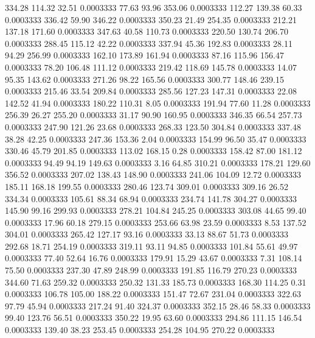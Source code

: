  334.28  114.32   32.51   0.0003333
  77.63   93.96  353.06   0.0003333
 112.27  139.38   60.33   0.0003333
 336.42   59.90  346.22   0.0003333
 350.23   21.49  254.35   0.0003333
 212.21  137.18  171.60   0.0003333
 347.63   40.58  110.73   0.0003333
 220.50  130.74  206.70   0.0003333
 288.45  115.12   42.22   0.0003333
 337.94   45.36  192.83   0.0003333
  28.11   94.29  256.99   0.0003333
 162.10  173.89  161.94   0.0003333
  87.16  115.96  156.47   0.0003333
  78.20  106.48  111.12   0.0003333
 219.42  118.69  145.78   0.0003333
  14.07   95.35  143.62   0.0003333
 271.26   98.22  165.56   0.0003333
 300.77  148.46  239.15   0.0003333
 215.46   33.54  209.84   0.0003333
 285.56  127.23  147.31   0.0003333
  22.08  142.52   41.94   0.0003333
 180.22  110.31    8.05   0.0003333
 191.94   77.60   11.28   0.0003333
 256.39   26.27  255.20   0.0003333
  31.17   90.90  160.95   0.0003333
 346.35   66.54  257.73   0.0003333
 247.90  121.26   23.68   0.0003333
 268.33  123.50  304.84   0.0003333
 337.48   38.28   42.25   0.0003333
 247.36  153.36    2.04   0.0003333
 154.99   96.50   35.47   0.0003333
 330.46   45.79  201.85   0.0003333
 113.02  168.15    0.28   0.0003333
 158.42   87.00  181.12   0.0003333
  94.49   94.19  149.63   0.0003333
   3.16   64.85  310.21   0.0003333
 178.21  129.60  356.52   0.0003333
 207.02  138.43  148.90   0.0003333
 241.06  104.09   12.72   0.0003333
 185.11  168.18  199.55   0.0003333
 280.46  123.74  309.01   0.0003333
 309.16   26.52  334.34   0.0003333
 105.61   88.34   68.94   0.0003333
 234.74  141.78  304.27   0.0003333
 145.90   99.16  299.93   0.0003333
 278.21  104.84  245.25   0.0003333
 303.08   44.65   99.40   0.0003333
  17.96   60.18  279.15   0.0003333
 253.66   63.98   23.59   0.0003333
   8.53  137.52  304.01   0.0003333
 265.42  127.17   93.16   0.0003333
  33.13   88.67   51.73   0.0003333
 292.68   18.71  254.19   0.0003333
 319.11   93.11   94.85   0.0003333
 101.84   55.61   49.97   0.0003333
  77.40   52.64   16.76   0.0003333
 179.91   15.29   43.67   0.0003333
   7.31  108.14   75.50   0.0003333
 237.30   47.89  248.99   0.0003333
 191.85  116.79  270.23   0.0003333
 344.60   71.63  259.32   0.0003333
 250.32  131.33  185.73   0.0003333
 168.30  114.25    0.31   0.0003333
 106.78  105.00  188.22   0.0003333
 151.47   72.67  231.04   0.0003333
 322.63   97.79   45.94   0.0003333
 217.24   91.40  324.37   0.0003333
 352.15   28.46   58.33   0.0003333
  99.40  123.76   56.51   0.0003333
 350.22   19.95   63.60   0.0003333
 294.86  111.15  146.54   0.0003333
 139.40   38.23  253.45   0.0003333
 254.28  104.95  270.22   0.0003333

